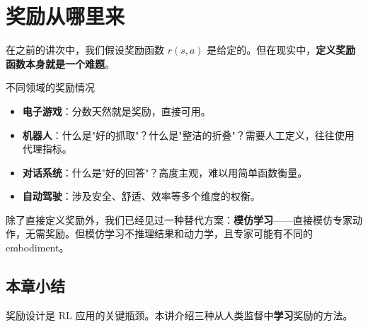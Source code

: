 \section{奖励从哪里来}

在之前的讲次中，我们假设奖励函数 $r(s, a)$ 是给定的。但在现实中，\textbf{定义奖励函数本身就是一个难题}。

\begin{knowledgebox}{不同领域的奖励情况}
\begin{itemize}
    \item \textbf{电子游戏}：分数天然就是奖励，直接可用。
    \item \textbf{机器人}：什么是"好的抓取"？什么是"整洁的折叠"？需要人工定义，往往使用代理指标。
    \item \textbf{对话系统}：什么是"好的回答"？高度主观，难以用简单函数衡量。
    \item \textbf{自动驾驶}：涉及安全、舒适、效率等多个维度的权衡。
\end{itemize}
\end{knowledgebox}

除了直接定义奖励外，我们已经见过一种替代方案：\textbf{模仿学习}——直接模仿专家动作，无需奖励。但模仿学习不推理结果和动力学，且专家可能有不同的 embodiment。

\subsection{本章小结}

奖励设计是 RL 应用的关键瓶颈。本讲介绍三种从人类监督中\textbf{学习}奖励的方法。

